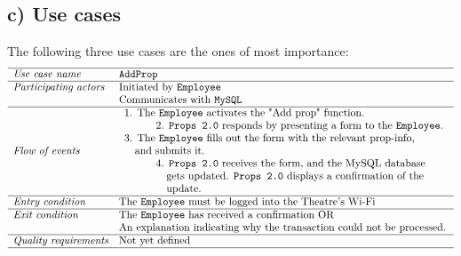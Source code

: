 \documentclass[12pt]{article}
\begin{document}
\subsection{c) Use cases}
The following three use cases are the ones of most importance:
\[
\begin{array}{ll}
\hline
\textit{Use case name} & \texttt{AddProp} \\
\hline
\textit{Participating actors} & \text{Initiated by \texttt{Employee}} \\
& \text{Communicates with \texttt{MySQL}} \\
\hline
\textit{Flow of events} & 
\begin{array}{l}
\text{1. The \texttt{Employee} activates the "Add prop"  function.}\\
\quad \quad \quad \text{2. \texttt{Props 2.0} responds by presenting a form to the \texttt{Employee}.} \\
\text{3. The \texttt{Employee} fills out the form with the relevant prop-info,} \\ \quad \text{and submits it.} \\
\quad \quad \quad \text{4. \texttt{Props 2.0} receives the form, and the MySQL database} \\ \quad \quad \quad \quad \text{gets updated. \texttt{Props 2.0} displays a confirmation of the}\\ \quad \quad \quad \quad \text{update.}
\end{array} \\
\hline
\textit{Entry condition} & \text{The \texttt{Employee} must be logged into the Theatre's Wi-Fi} \\
\hline
\textit{Exit condition} & \text{The \texttt{Employee} has received a confirmation OR} \\ & \text{An explanation indicating why the transaction could not be processed.} \\
\hline
\textit{Quality requirements} & \text{Not yet defined} \\
\hline
\end{array}
\]
\\\\
\end{document}
